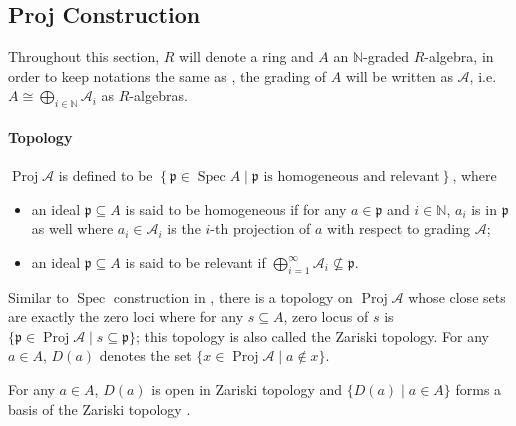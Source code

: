 \documentclass[a4paper,UKenglish,cleveref, autoref, thm-restate]{lipics-v2021}
\begin{document}
\subsection{Proj Construction}\label{sec:proj_construction_maths}
Throughout this section, $R$ will denote a ring and $A$ an $\mathbb{N}$-graded $R$-algebra, in order to keep notations the same as , the grading of $A$ will be written as $\mathcal{A}$, i.e. $A\cong \bigoplus_{i\in\mathbb{N}}\mathcal{A}_i$ as $R$-algebras.

\paragraph*{Topology}
\begin{definition}
    $\operatorname{Proj}\mathcal{A}$ is defined to be
    $
        \left\{\mathfrak{p}\in \operatorname{Spec}A\mid \mathfrak{p}\text{~is homogeneous and relevant}\right\}    
    $, where
    \begin{itemize}
        \item an ideal $\mathfrak{p}\subseteq A$ is said to be homogeneous if for any $a \in \mathfrak{p}$ and $i\in \mathbb{N}$, $a_i$ is in $\mathfrak{p}$ as well where $a_i \in \mathcal{A}_i$ is the $i$-th projection of $a$ with respect to grading $\mathcal{A}$;
        \item an ideal $\mathfrak{p}\subseteq A$ is said to be relevant if $\bigoplus_{i=1}^\infty \mathcal{A}_i\not\subseteq \mathfrak{p}$.
    \end{itemize}
\end{definition}

Similar to $\operatorname{Spec}$ construction in , there is a topology on $\operatorname{Proj}\mathcal{A}$ whose close sets are exactly the zero loci where for any $s \subseteq A$, zero locus of $s$ is $\{\mathfrak p\in \operatorname{Proj}\mathcal{A}\mid s \subseteq \mathfrak{p}\}$; this topology is also called the Zariski topology. For any $a \in A$, $D(a)$ denotes the set $\{x\in \operatorname{Proj}\mathcal{A}\mid a\not\in x\}$.

\begin{theorem} 
    For any $a\in A$, $D(a)$ is open in Zariski topology and $\{D(a)\mid a\in A\}$ forms a basis of the Zariski topology \cite{stacks-project}.
    
\end{theorem}
\end{document}

